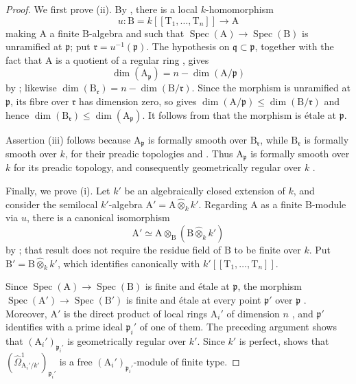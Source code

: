 \begin{proof}
We first prove (ii). By , there is a local $k$-homomorphism
\[
  u:\mathrm{B}=k[[\mathrm{T}_1,\ldots,\mathrm{T}_n]]\longrightarrow\mathrm{A}
\]
making $\mathrm{A}$ a finite $\mathrm{B}$-algebra and such that $\operatorname{Spec}(\mathrm{A})\to\operatorname{Spec}(\mathrm{B})$ is unramified at $\mathfrak p$; put $\mathfrak r=u^{-1}(\mathfrak p)$. The hypothesis on $\mathfrak q\subset\mathfrak p$, together with the fact that $\mathrm{A}$ is a quotient of a regular ring , gives
\[
  \dim(\mathrm{A}_\mathfrak p)=n-\dim(\mathrm{A}/\mathfrak p)
\]
by ; likewise $\dim(\mathrm{B}_\mathfrak r)=n-\dim(\mathrm{B}/\mathfrak r)$. Since the morphism is unramified at $\mathfrak p$, its fibre over $\mathfrak r$ has dimension zero, so  gives $\dim(\mathrm{A}/\mathfrak p)\leq\dim(\mathrm{B}/\mathfrak r)$ and hence $\dim(\mathrm{B}_\mathfrak r)\leq\dim(\mathrm{A}_\mathfrak p)$. It follows from  that the morphism is \'etale at $\mathfrak p$.

Assertion (iii) follows because $\mathrm{A}_\mathfrak p$ is formally smooth over $\mathrm{B}_\mathfrak r$, while $\mathrm{B}_\mathfrak r$ is formally smooth over $k$, for their preadic topologies  and . Thus $\mathrm{A}_\mathfrak p$ is formally smooth over $k$ for its preadic topology, and consequently geometrically regular over $k$ .

Finally, we prove (i). Let $k'$ be an algebraically closed extension of $k$, and consider the semilocal $k'$-algebra $\mathrm{A}'=\mathrm{A}\widehat{\otimes}_kk'$. Regarding $\mathrm{A}$ as a finite $\mathrm{B}$-module via $u$, there is a canonical isomorphism
\[
  \mathrm{A}'\simeq\mathrm{A}\otimes_{\mathrm{B}}(\mathrm{B}\widehat{\otimes}_kk')
\]
by ; that result does not require the residue field of $\mathrm{B}$ to be finite over $k$. Put $\mathrm{B}'=\mathrm{B}\widehat{\otimes}_kk'$, which identifies canonically with $k'[[\mathrm{T}_1,\ldots,\mathrm{T}_n]]$.

Since $\operatorname{Spec}(\mathrm{A})\to\operatorname{Spec}(\mathrm{B})$ is finite and \'etale at $\mathfrak p$, the morphism $\operatorname{Spec}(\mathrm{A}')\to\operatorname{Spec}(\mathrm{B}')$ is finite and \'etale at every point $\mathfrak p'$ over $\mathfrak p$ . Moreover, $\mathrm{A}'$ is the direct product of local rings $\mathrm{A}_i'$ of dimension $n$ , and $\mathfrak p'$ identifies with a prime ideal $\mathfrak p_i'$ of one of them. The preceding argument shows that $(\mathrm{A}_i')_{\mathfrak p_i'}$ is geometrically regular over $k'$. Since $k'$ is perfect,  shows that $(\hat{\Omega}^1_{\mathrm{A}_i'/k'})_{\mathfrak p_i'}$ is a free $(\mathrm{A}_i')_{\mathfrak p_i'}$-module of finite type.


\end{proof}
